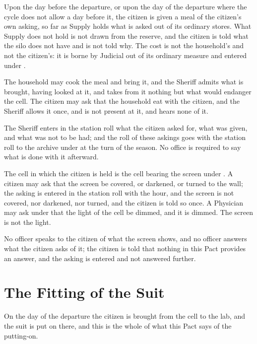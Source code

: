 \begin{clauses}
\item Upon the day before the departure, or upon the day of the departure where the cycle does not allow a day before it, the citizen is given a meal of the citizen's own asking, so far as Supply holds what is asked out of its ordinary stores. What Supply does not hold is not drawn from the reserve, and the citizen is told what the silo does not have and is not told why. The cost is not the household's and not the citizen's: it is borne by Judicial out of its ordinary measure and entered under .
\item The household may cook the meal and bring it, and the Sheriff admits what is brought, having looked at it, and takes from it nothing but what would endanger the cell. The citizen may ask that the household eat with the citizen, and the Sheriff allows it once, and is not present at it, and hears none of it.
\item The Sheriff enters in the station roll what the citizen asked for, what was given, and what was not to be had; and the roll of these askings goes with the station roll to the archive under  at the turn of the season. No office is required to say what is done with it afterward.
\item The cell in which the citizen is held is the cell bearing the screen under . A citizen may ask that the screen be covered, or darkened, or turned to the wall; the asking is entered in the station roll with the hour, and the screen is not covered, nor darkened, nor turned, and the citizen is told so once. A Physician may ask under  that the light of the cell be dimmed, and it is dimmed. The screen is not the light.
\item No officer speaks to the citizen of what the screen shows, and no officer answers what the citizen asks of it; the citizen is told that nothing in this Pact provides an answer, and the asking is entered and not answered further.
\end{clauses}

\section{The Fitting of the Suit}
\label{sec:cleaning:fitting-of-the-suit}

On the day of the departure the citizen is brought from the cell to the lab, and the suit is put on there, and this is the whole of what this Pact says of the putting-on.


